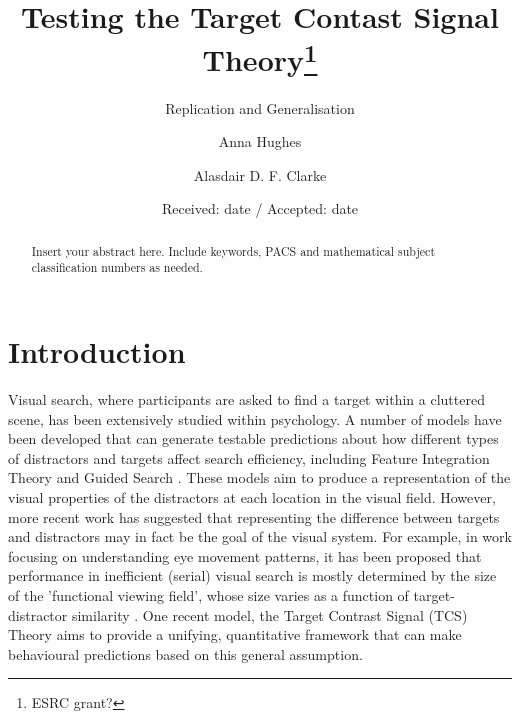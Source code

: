 \documentclass[smallextended]{svjour3}       %
\begin{document}
\title{Testing the Target Contast Signal Theory\thanks{ESRC grant?}
}
\subtitle{Replication and Generalisation}


\author{Anna Hughes \and Alasdair D. F. Clarke
}



\date{Received: date / Accepted: date}

\maketitle

\begin{abstract}
Insert your abstract here. Include keywords, PACS and mathematical
subject classification numbers as needed.
\end{abstract}

\section{Introduction}
\label{intro}

Visual search, where participants are asked to find a target within a cluttered scene, has been extensively studied within psychology. A number of models have been developed that can generate testable predictions about how different types of distractors and targets affect search efficiency, including Feature Integration Theory \cite{treisman1980feature} and Guided Search \cite{wolfe1989guided,wolfe2014approaches}. These models aim to produce a representation of the visual properties of the distractors at each location in the visual field. However, more recent work has suggested that representing the difference between targets and distractors may in fact be the goal of the visual system. For example, in work focusing on understanding eye movement patterns, it has been proposed that performance in inefficient (serial) visual search is mostly determined by the size of the 'functional viewing field', whose size varies as a function of target-distractor similarity \cite{hulleman2017brink}. One recent model, the Target Contrast Signal (TCS) Theory \cite{lleras2020target} aims to provide a unifying, quantitative framework that can make behavioural predictions based on this general assumption.
\end{document}
